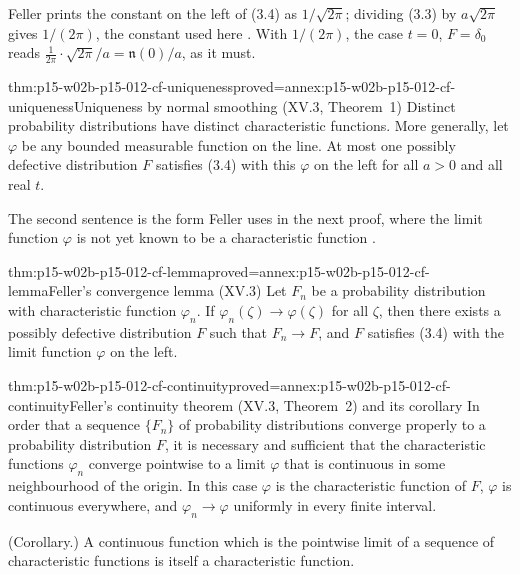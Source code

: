 Feller prints the constant on the left of (3.4) as \(1/\sqrt{2\pi}\); dividing
(3.3) by \(a\sqrt{2\pi}\) gives \(1/(2\pi)\), the constant used here
\cite[vol.~II, XV.3, p.~507]{Feller1971ProbabilityII}. With \(1/(2\pi)\), the
case \(t=0\), \(F=\delta_0\) reads \(\frac1{2\pi}\cdot\sqrt{2\pi}/a=\mathfrak n(0)/a\), as it must.

\begin{hbtheorem}{thm:p15-w02b-p15-012-cf-uniqueness}{proved=annex:p15-w02b-p15-012-cf-uniqueness}{Uniqueness by normal smoothing (XV.3, Theorem~1)}
Distinct probability distributions have distinct characteristic functions.
More generally, let \(\varphi\) be any bounded measurable function on the
line. At most one possibly defective distribution \(F\) satisfies (3.4) with
this \(\varphi\) on the left for all \(a>0\) and all real \(t\).
\end{hbtheorem}

The second sentence is the form Feller uses in the next proof, where the limit
function \(\varphi\) is not yet known to be a characteristic function
\cite[vol.~II, XV.3, p.~508]{Feller1971ProbabilityII}.

\begin{hblemma}{thm:p15-w02b-p15-012-cf-lemma}{proved=annex:p15-w02b-p15-012-cf-lemma}{Feller's convergence lemma (XV.3)}
Let \(F_n\) be a probability distribution with characteristic function
\(\varphi_n\). If \(\varphi_n(\zeta)\to\varphi(\zeta)\) for all \(\zeta\), then
there exists a possibly defective distribution \(F\) such that \(F_n\to F\),
and \(F\) satisfies (3.4) with the limit function \(\varphi\) on the left.
\end{hblemma}

\begin{hbtheorem}{thm:p15-w02b-p15-012-cf-continuity}{proved=annex:p15-w02b-p15-012-cf-continuity}{Feller's continuity theorem (XV.3, Theorem~2) and its corollary}
In order that a sequence \(\{F_n\}\) of probability distributions converge
properly to a probability distribution \(F\), it is necessary and sufficient
that the characteristic functions \(\varphi_n\) converge pointwise to a limit
\(\varphi\) that is continuous in some neighbourhood of the origin. In this
case \(\varphi\) is the characteristic function of \(F\), \(\varphi\) is
continuous everywhere, and \(\varphi_n\to\varphi\) uniformly in every finite
interval.

(Corollary.) A continuous function which is the pointwise limit of a sequence
of characteristic functions is itself a characteristic function.
\end{hbtheorem}

